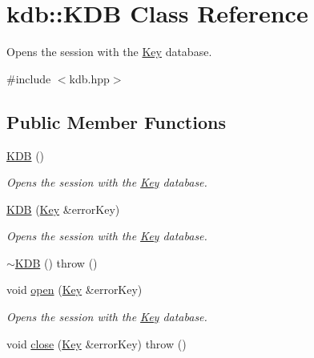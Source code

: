 \hypertarget{classkdb_1_1KDB}{\section{kdb\-:\-:K\-D\-B Class Reference}
\label{classkdb_1_1KDB}
}


Opens the session with the \hyperlink{classkdb_1_1Key}{Key} database.    




{\ttfamily \#include $<$kdb.\-hpp$>$}

\subsection*{Public Member Functions}
\begin{DoxyCompactItemize}
\item 
\hyperlink{classkdb_1_1KDB_a7e0637995ce9f294cdbc6f167df6db40}{K\-D\-B} ()
\begin{DoxyCompactList}\small\item\em Opens the session with the \hyperlink{classkdb_1_1Key}{Key} database.  \end{DoxyCompactList}\item 
\hyperlink{classkdb_1_1KDB_a98e25c7fe2f47c5a90461676c6d219e7}{K\-D\-B} (\hyperlink{classkdb_1_1Key}{Key} \&error\-Key)
\begin{DoxyCompactList}\small\item\em Opens the session with the \hyperlink{classkdb_1_1Key}{Key} database.  \end{DoxyCompactList}\item 
\hyperlink{classkdb_1_1KDB_af61bf771d2b75df730226fcae57eaa25}{$\sim$\-K\-D\-B} ()  throw ()
\begin{DoxyCompactList}\small\item\em \end{DoxyCompactList}\item 
void \hyperlink{classkdb_1_1KDB_aee37484b06164eacc0cc11b7b40ab892}{open} (\hyperlink{classkdb_1_1Key}{Key} \&error\-Key)
\begin{DoxyCompactList}\small\item\em Opens the session with the \hyperlink{classkdb_1_1Key}{Key} database.  \end{DoxyCompactList}\item 
void \hyperlink{classkdb_1_1KDB_aa027a8f798a2cfee11ff712eb204c35d}{close} (\hyperlink{classkdb_1_1Key}{Key} \&error\-Key)  throw ()
\begin{DoxyCompactList}\small\item\em \end{DoxyCompactList}\item 

\end{DoxyCompactItemize}
